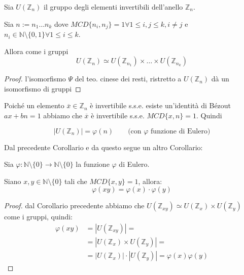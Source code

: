 \documentclass[../main.tex]{subfiles}
\begin{document}
\begin{corollary}
    Sia $U(\mathbb{Z}_n)$ il gruppo degli elementi invertibili dell'anello $\mathbb{Z}_n$.

    Sia $n := n_1 \ldots n_k$ dove $MCD\{n_i, n_j\} = 1 \forall 1 \leq i,j \leq k, i \neq j$ e $n_i \in \mathbb{N} \setminus \{0,1\} \forall 1 \leq i \leq k$.

    Allora come i gruppi
    \begin{equation*}
        U(\mathbb{Z}_n) \simeq U(\mathbb{Z}_{n_1}) \times \ldots \times U(\mathbb{Z}_{n_k})
    \end{equation*}
\end{corollary}
\begin{proof}
    l'isomorfismo $\Psi$ del teo. cinese dei resti, ristretto a $U(\mathbb{Z}_n)$ dà un isomorfismo di gruppi
\end{proof}

Poiché un elemento $\overline{x} \in \mathbb{Z}_n$ è invertibile s.s.e. esiste un'identità di Bézout $ax + bn = 1$ abbiamo che $\overline{x}$ è invertibile s.s.e. $MCD\{x,n\} = 1$. Quindi

\begin{equation*}
    |U(\mathbb{Z}_n)| = \varphi(n) \qquad \text{(con $\varphi$ funzione di Eulero)}
\end{equation*}


Dal precedente Corollario e da questo segue un altro Corollario:

\begin{corollary}
    Sia $\varphi : \mathbb{N} \setminus \{0\} \rightarrow \mathbb{N} \setminus \{0\}$ la funzione $\varphi$ di Eulero.

    Siano $x,y \in \mathbb{N} \setminus \{0\}$ tali che $MCD\{x,y\} = 1$, allora:
    \begin{equation*}
        \varphi(xy) = \varphi(x) \cdot \varphi(y)
    \end{equation*}
\end{corollary}
\begin{proof}
    dal Corollario precedente abbiamo che $U(\mathbb{Z}_{xy}) \simeq U(\mathbb{Z}_x) \times U(\mathbb{Z}_y)$ come i gruppi, quindi:
    \begin{align*}
        \varphi(xy) & = |U(\mathbb{Z}_{xy})| =                                            \\
                    & = |U(\mathbb{Z}_x) \times U(\mathbb{Z}_y)| =                        \\
                    & = |U(\mathbb{Z}_x)| \cdot |U(\mathbb{Z}_y)| = \varphi(x) \varphi(y)
    \end{align*}
\end{proof}
\end{document}
